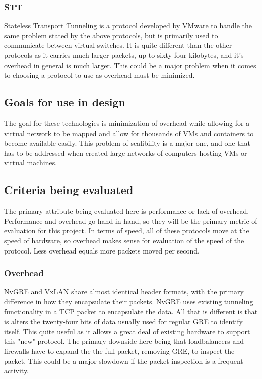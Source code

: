 \documentclass[10pt,letterpaper,onecolumn,draftclsnofoot]{IEEEtran}
\begin{document}
\subsubsection{STT}
Stateless Transport Tunneling is a protocol developed by VMware to handle the
same problem stated by the above protocols, but is primarily used to communicate
between virtual switches. It is quite different than the other protocols as it
carries much larger packets, up to sixty-four kilobytes, and it's overhead in
general is much larger. This could be a major problem when it comes to choosing
a protocol to use as overhead must be minimized.

\subsection{Goals for use in design}
The goal for these technologies is minimization of overhead while allowing for a
virtual network to be mapped and allow for thousands of VMs and containers to
become available easily. This problem of scalibility is a major one, and one
that has to be addressed when created large networks of computers hosting VMs or
virtual machines.

\subsection{Criteria being evaluated}
The primary attribute being evaluated here is performance or lack of overhead.
Performance and overhead go hand in hand, so they will be the primary metric of
evaluation for this project. In terms of speed, all of these protocols move at
the speed of hardware, so overhead makes sense for evaluation of the speed of
the protocol. Less overhead equals more packets moved per second.

\subsubsection{Overhead}
NvGRE and VxLAN share almost identical header formats, with the primary
difference in how they encapsulate their packets. NvGRE uses existing tunneling
functionality in a TCP packet to encapsulate the data. All that is different is
that is alters the twenty-four bits of data usually used for regular GRE to
identify itself. This quite useful as it allows a great deal of existing
hardware to support this "new" protocol. The primary downside here being that
loadbalancers and firewalls have to expand the the full packet, removing GRE, to
inspect the packet. This could be a major slowdown if the packet inspection is a
frequent activity.\cite{nvgre-vs-vxlan}
\end{document}
